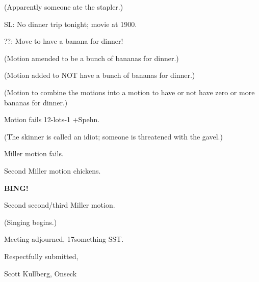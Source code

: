 \documentclass[12pt]{article}
\newcommand{\bing}{{\bf BING!} }
\begin{document}
(Apparently someone ate the stapler.)

SL: No dinner trip tonight; movie at 1900.

??: Move to have a banana for dinner!

(Motion amended to be a bunch of bananas for dinner.)

(Motion added to NOT have a bunch of bananas for dinner.)

(Motion to combine the motions into a motion to have or not have zero or more bananas for dinner.)

Motion fails 12-lots-1 +Spehn.

(The skinner is called an idiot; someone is threatened with the gavel.)

Miller motion fails.

Second Miller motion chickens.

\bing

Second second/third Miller motion.

(Singing begins.)

\vspace{12pt}

\noindent
Meeting adjourned, 17something SST.

\vspace{18pt}

\centerline{Respectfully submitted,}
\centerline{Scott Kullberg, Onseck}
\end{document}

